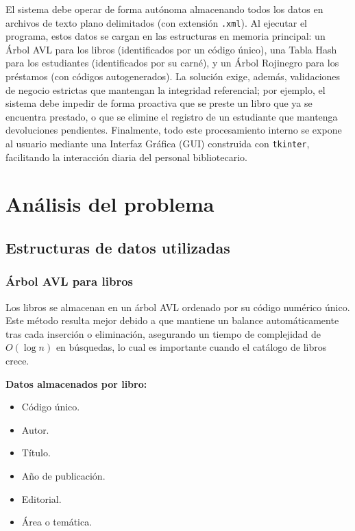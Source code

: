 \documentclass[11pt]{article}
\begin{document}
El sistema debe operar de forma autónoma almacenando todos los datos en archivos de texto plano delimitados (con extensión \texttt{.xml}). Al ejecutar el programa, estos datos se cargan en las estructuras en memoria principal: un Árbol AVL para los libros (identificados por un código único), una Tabla Hash para los estudiantes (identificados por su carné), y un Árbol Rojinegro para los préstamos (con códigos autogenerados). La solución exige, además, validaciones de negocio estrictas que mantengan la integridad referencial; por ejemplo, el sistema debe impedir de forma proactiva que se preste un libro que ya se encuentra prestado, o que se elimine el registro de un estudiante que mantenga devoluciones pendientes. Finalmente, todo este procesamiento interno se expone al usuario mediante una Interfaz Gráfica (GUI) construida con \texttt{tkinter}, facilitando la interacción diaria del personal bibliotecario.

\section{Análisis del problema}

\subsection{Estructuras de datos utilizadas}

\subsubsection{Árbol AVL para libros}

Los libros se almacenan en un árbol AVL ordenado por su código numérico único. Este método resulta mejor debido a que mantiene un balance automáticamente tras cada inserción o eliminación, asegurando un tiempo de complejidad de $O(\log n)$ en búsquedas, lo cual es importante cuando el catálogo de libros crece.

\textbf{Datos almacenados por libro:}
\begin{itemize}[noitemsep]
    \item Código único.
    \item Autor.
    \item Título.
    \item Año de publicación.
    \item Editorial.
    \item Área o temática.
\end{itemize}
\end{document}
